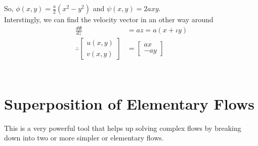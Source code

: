 \documentclass{book}
\begin{document}
So, $\phi(x,y)=\frac{a}{2}(x^2-y^2)$ and $\psi(x,y)=2axy$.\\
Interstingly, we can find the velocity vector in an other way around \textemdash
\begin{equation*}
\begin{split}
\frac{d \Phi}{dz}&=az=a(x+\iota y)\\
\therefore \begin{bmatrix}u(x,y)\\[0.3cm]v(x,y)\end{bmatrix}&=\begin{bmatrix}ax\\[0.3cm]-ay\end{bmatrix}\\
\end{split}
\end{equation*}
\\
\begin{center}
\end{center} 
\section{Superposition of Elementary Flows}
This is a very powerful tool that helps up solving complex flows by breaking down into two or more simpler or elementary flows.
\end{document}
